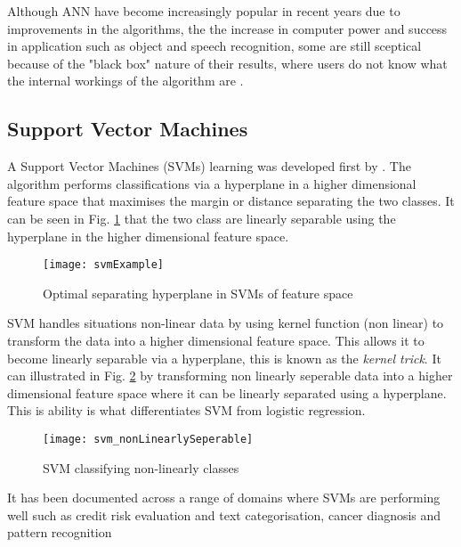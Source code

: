 Although ANN have become increasingly popular in recent years due to improvements in the algorithms, the the increase in computer power and success in application such as object and speech recognition,  some are still sceptical because of the "black box" nature of their results, where users do not know what the internal workings of the algorithm are  \citep{kaastra_forecasting_1995}. 



\subsection{Support Vector Machines} \label{SVM}
A Support Vector Machines (SVMs) learning was developed first by \cite{vapnik_nature_1995}. The algorithm performs classifications via a hyperplane in a higher dimensional feature space that maximises the margin or distance separating the two classes. It can be seen in Fig. \ref{fig:svmExample} that the two class are linearly separable using the hyperplane in the higher dimensional feature space. 

\begin{figure}[H]
	\texttt{[image: svmExample]}
	\caption{Optimal separating hyperplane in SVMs of feature space \\
		\cite[Source:][]{li_adaptive_2011}
	}
	\label{fig:svmExample}
\end{figure}

SVM handles situations non-linear data by using kernel function (non linear) to transform the data into a higher dimensional feature space. This allows it to become linearly separable via a hyperplane, this is known as the \textit{kernel trick}. It can illustrated in Fig. \ref{fig:svm_nonLinearlySeperable} by transforming non linearly seperable data into a higher dimensional feature space where it can be linearly separated using a hyperplane. This is ability is what differentiates SVM from logistic regression.

\begin{figure}[H]
	\texttt{[image: svm\_nonLinearlySeperable]}
	\caption{SVM classifying non-linearly classes \\
		\cite[Source:][]{burges_tutorial_1998}
	}
	\label{fig:svm_nonLinearlySeperable}
\end{figure}

It has been documented across a range of domains where SVMs are performing well such as credit risk evaluation \cite{van_gestel_credit_2009} and text categorisation, cancer diagnosis and pattern recognition \citep{shin_application_2005}

